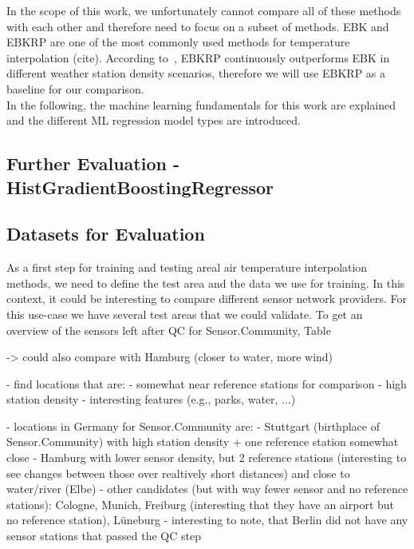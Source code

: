 In the scope of this work, we unfortunately cannot compare all of these methods with each other and therefore need to focus on a subset of methods. EBK and EBKRP are one of the most commonly used methods for temperature interpolation (cite). According to~\cite{njoku2023effects}, EBKRP continuously outperforms EBK in different weather station density scenarios, therefore we will use EBKRP as a baseline for our comparison.\\
In the following, the machine learning fundamentals for this work are explained and the different ML regression model types are introduced.


\subsection{Further Evaluation - HistGradientBoostingRegressor}

\subsection{Datasets for Evaluation}

As a first step for training and testing areal air temperature interpolation methods, we need to define the test area and the data we use for training. In this context, it could be interesting to compare different sensor network providers.
For this use-case we have several test areas that we could validate. To get an overview of the sensors left after QC for Sensor.Community, Table 

-> could also compare with Hamburg (closer to water, more wind)

- find locations that are:
  - somewhat near reference stations for comparison
  - high station density
  - interesting features (e.g., parks, water, ...)

- locations in Germany for Sensor.Community are:
  - Stuttgart (birthplace of Sensor.Community) with high station density + one reference station somewhat close
  - Hamburg with lower sensor density, but 2 reference stations (interesting to see changes between those over realtively short distances) and close to water/river (Elbe)
  - other candidates (but with way fewer sensor and no reference stations): Cologne, Munich, Freiburg (interesting that they have an airport but no reference station), Lüneburg
  - interesting to note, that Berlin did not have any sensor stations that passed the QC step\\

